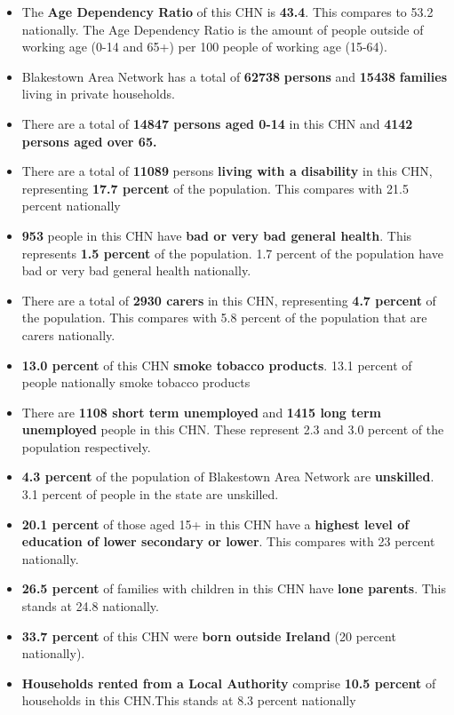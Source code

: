 \documentclass{article}
\begin{document}
\begin{itemize}

\item The \textbf{Age Dependency Ratio} of this CHN is  \textbf{43.4}. This compares to 53.2 nationally. The Age Dependency Ratio is the amount of people outside of working age (0-14 and 65+) per 100 people of working age (15-64). 

\item Blakestown Area Network has a total of \textbf{\num{62738}} \textbf{persons} and  \textbf{\num{15438}} \textbf{families} living in private households.

\item There are a total of \textbf{\num{14847} persons aged 0-14} in this CHN and \textbf{\num{4142} persons aged over 65.} 

\item There are a total of \textbf{\num{11089}} persons \textbf{living with a disability} in this CHN, representing \textbf{17.7 percent} of the population. This compares with  21.5 percent nationally

\item \textbf{\num{953}} people in this CHN have \textbf{bad or very bad general health}. This represents \textbf{1.5 percent} of the population. 1.7 percent of the population have bad or very bad general health nationally. 

\item There are a total of \textbf{\num{2930} carers} in this CHN, representing \textbf{4.7 percent} of the population. This compares with 5.8 percent of the population that are carers nationally. 

\item \textbf{13.0 percent} of this CHN \textbf{smoke tobacco products}. 13.1 percent of people nationally smoke tobacco products

\item There are \textbf{\num{1108} short term unemployed} and \textbf{\num{1415} long term unemployed} people in this CHN. These represent 2.3 and 3.0 percent of the population respectively.

\item  \textbf{4.3 percent} of the population of Blakestown Area Network are \textbf{unskilled}. 3.1 percent of people in the state are unskilled.

\item \textbf{20.1 percent} of those aged 15+ in this CHN have a \textbf{highest level of education of lower secondary or lower}. This compares with 23 percent nationally. 

\item \textbf{26.5 percent} of families with children in this CHN have \textbf{lone parents}. This stands at 24.8 nationally.

\item \textbf{33.7 percent} of this CHN were \textbf{born outside Ireland} (20 percent nationally).

\item \textbf{Households rented from a Local Authority} comprise \textbf{10.5 percent} of households in this CHN.This stands at 8.3 percent nationally

\end{itemize}
\end{document}
